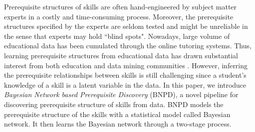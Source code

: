 \documentclass{edm_template}
\begin{document}
Prerequisite structures of skills are often hand-engineered by subject matter experts in a costly and time-consuming process. 
Moreover, the prerequisite structures specified by the experts are seldom tested and might be unreliable in
the sense that experts may hold ``blind spots".
Nowadays, large volume of educational data has been cumulated through the online tutoring systems.  
Thus, learning prerequisite structures from educational data has drawn substantial interest from both education and data mining communities \cite{desmarais2006learned,vuong2010method, brunskill2010estimating,scheines2014discovering,chen2015discovering,piech2015deep}.
However, inferring the prerequisite relationships between skills is still challenging since a student's knowledge of a skill is a latent variable in the data.
In this paper, we introduce \emph{Bayesian Network based Prerequisite Discovery} (BNPD), 
a novel pipeline for discovering prerequisite structure of skills from data. 
BNPD models the prerequisite structure of the skills with a statistical model called Bayesian network.
It then learns the Bayesian network through a two-stage process. 



\end{document}
